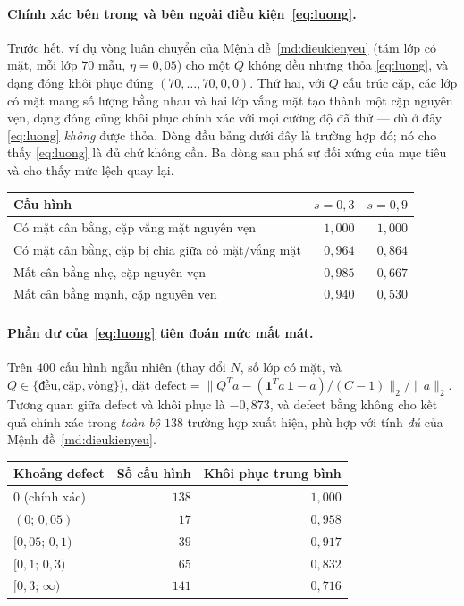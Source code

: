 \documentclass[11pt]{article}
\theoremstyle{remark}
\newcommand{\one}{\mathbf{1}}
\begin{document}
\paragraph{Chính xác bên trong và bên ngoài điều kiện~\eqref{eq:luong}.}
Trước hết, ví dụ vòng luân chuyển của Mệnh đề~\ref{md:dieukienyeu} (tám lớp
có mặt, mỗi lớp $70$ mẫu, $\eta = 0{,}05$) cho một $Q$ không đều nhưng thỏa
\eqref{eq:luong}, và dạng đóng khôi phục đúng $(70,\ldots,70,0,0)$. Thứ hai,
với $Q$ cấu trúc cặp, các lớp có mặt mang số lượng bằng nhau và hai lớp vắng
mặt tạo thành một cặp nguyên vẹn, dạng đóng cũng khôi phục chính xác với mọi
cường độ đã thử --- dù ở đây \eqref{eq:luong} \emph{không} được thỏa. Dòng đầu
bảng dưới đây là trường hợp đó; nó cho thấy \eqref{eq:luong} là đủ chứ không
cần. Ba dòng sau phá sự đối xứng của mục tiêu và cho thấy mức lệch quay lại.

\begin{center}
\footnotesize
\begin{tabular}{@{}lrr@{}}
\toprule
Cấu hình & $s=0{,}3$ & $s=0{,}9$ \\
\midrule
Có mặt cân bằng, cặp vắng mặt nguyên vẹn & $1{,}000$ & $1{,}000$ \\
Có mặt cân bằng, cặp bị chia giữa có mặt/vắng mặt & $0{,}964$ & $0{,}864$ \\
Mất cân bằng nhẹ, cặp nguyên vẹn & $0{,}985$ & $0{,}667$ \\
Mất cân bằng mạnh, cặp nguyên vẹn & $0{,}940$ & $0{,}530$ \\
\bottomrule
\end{tabular}
\end{center}

\paragraph{Phần dư của~\eqref{eq:luong} tiên đoán mức mất mát.}
Trên $400$ cấu hình ngẫu nhiên (thay đổi $N$, số lớp có mặt, và
$Q \in \{\text{đều}, \text{cặp}, \text{vòng}\}$), đặt
$\mathrm{defect} = \|Q^Ta - (\one^Ta\,\one - a)/(C-1)\|_2/\|a\|_2$. Tương
quan giữa defect và khôi phục là $-0{,}873$, và defect bằng không cho kết quả
chính xác trong \emph{toàn bộ} $138$ trường hợp xuất hiện, phù hợp với tính
\emph{đủ} của Mệnh đề~\ref{md:dieukienyeu}.

\begin{center}
\footnotesize
\begin{tabular}{@{}lrr@{}}
\toprule
Khoảng defect & Số cấu hình & Khôi phục trung bình \\
\midrule
$0$ (chính xác) & $138$ & $1{,}000$ \\
$(0;\,0{,}05)$  & $17$  & $0{,}958$ \\
$[0{,}05;\,0{,}1)$ & $39$ & $0{,}917$ \\
$[0{,}1;\,0{,}3)$ & $65$  & $0{,}832$ \\
$[0{,}3;\,\infty)$ & $141$ & $0{,}716$ \\
\bottomrule
\end{tabular}
\end{center}
\end{document}
